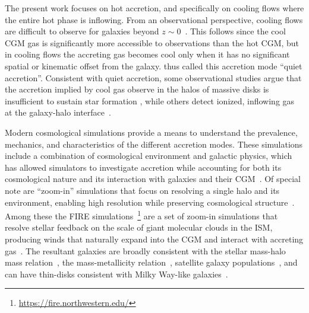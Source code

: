 \documentclass[fleqn,usenatbib]{mnras}
\begin{document}
The present work focuses on hot accretion, and specifically on cooling flows where the entire hot phase is inflowing.  
From an observational perspective, cooling flows are difficult to observe for galaxies beyond
$z\sim0$~\citep{Putman2012}.
This follows since the cool CGM gas is significantly more accessible to observations than the hot CGM, but in cooling flows the accreting gas becomes cool only when it has no significant spatial or kinematic offset from the galaxy.
\citeauthor{Putman2012} thus called this accretion mode ``quiet accretion''. 
Consistent with quiet accretion, some observational studies argue that the accretion implied by cool gas observe in the halos of massive disks is insufficient to sustain star formation \citep{Binney09}, while others detect ionized, inflowing gas at the galaxy-halo interface~\citep{Zheng2017}. 



Modern cosmological simulations provide a means to understand the prevalence, mechanics, and characteristics of the different accretion modes.
These simulations include a combination of cosmological environment and galactic physics, which has allowed simulators to investigate accretion while accounting for both its cosmological nature and its interaction with galaxies and their CGM~\citep[e.g.][]{Oppenheimer2010, Stewart2011, Fernandez2012, Ford2014, Angles-Alcazar2017, Hafen2019, Hafen2020, Ho2019, Rottgers2020, Trapp2021}.
Of special note are ``zoom-in'' simulations that focus on resolving a single halo and its environment, enabling high resolution while preserving cosmological structure~\citep[e.g.][]{Katz1993, Hopkins2014, Hopkins2018, Wang2015, Agertz2020}.
Among these the FIRE simulations~\citep{Hopkins2014, Hopkins2017}\footnote{\url{https://fire.northwestern.edu/}} are a set of zoom-in simulations that resolve stellar feedback on the scale of giant molecular clouds in the ISM, producing winds that naturally expand into the CGM and interact with accreting gas~\citep{Muratov2015, Muratov2017, Hafen2019, Hafen2020}.
The resultant galaxies are broadly consistent with the stellar mass-halo mass relation~\citep{Hopkins2017}, the mass-metallicity relation~\citep{Ma2016a}, satellite galaxy populations~\citep{Wetzel2016, Garrison-Kimmel2019a}, and can have thin-disks consistent with Milky Way-like galaxies~\citep{Garrison-Kimmel2018, El-Badry2018}.
\end{document}
